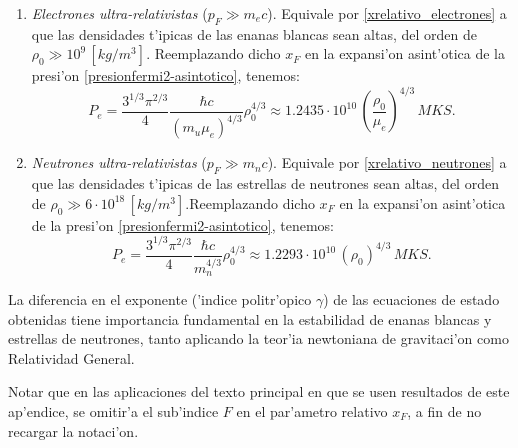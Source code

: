 \begin{enumerate}
\begin{enumerate}
\item \emph{Electrones ultra-relativistas} ($p_F\gg m_{e}c$). Equivale por  \eqref{xrelativo_electrones} a que las densidades t'ipicas de las enanas blancas sean altas, del orden de $\rho_0\gg10^{9}\,[kg/m^3]$. Reemplazando dicho $x_F$ en la expansi'on asint'otica de la presi'on \eqref{presionfermi2-asintotico}, tenemos:
\begin{equation}\label{fermi_relativista}
 \boxed{P_e=\frac{3^{1/3}\pi^{2/3}}{4}\frac{\hbar c}{(m_u\mu_e)^{4/3}}\rho_0^{4/3}\approx1.2435\cdot 10^{10}\,\left(\frac{\rho_0}{\mu_e}\right)^{4/3}\,MKS.}
\end{equation}

\item \emph{Neutrones ultra-relativistas} ($p_F\gg m_{n}c$). Equivale por  \eqref{xrelativo_neutrones} a que las densidades t'ipicas de las estrellas de neutrones sean altas, del orden de $\rho_0\gg6\cdot10^{18}\,[kg/m^3]$.Reemplazando dicho $x_F$ en la expansi'on asint'otica de la presi'on \eqref{presionfermi2-asintotico}, tenemos:
\begin{equation}\label{fermi_relativista2}
 \boxed{P_e=\frac{3^{1/3}\pi^{2/3}}{4}\frac{\hbar c}{m_n^{4/3}}\rho_0^{4/3}\approx1.2293\cdot 10^{10}\,\left(\rho_0\right)^{4/3}\,MKS.}
\end{equation}

\end{enumerate}
\end{enumerate}

La diferencia en el exponente ('indice politr'opico $\gamma$) de las ecuaciones de estado obtenidas tiene importancia fundamental en la estabilidad de enanas blancas y estrellas de neutrones, tanto aplicando la teor'ia newtoniana de gravitaci'on como Relatividad General.

Notar que en las aplicaciones del texto principal en que se usen resultados de este ap'endice, se omitir'a el sub'indice $F$ en el par'ametro relativo $x_F$, a fin de no recargar la notaci'on.

